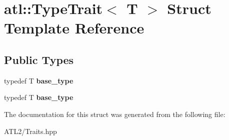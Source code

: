 \hypertarget{structatl_1_1_type_trait}{\section{atl\+:\+:Type\+Trait$<$ T $>$ Struct Template Reference}
\label{structatl_1_1_type_trait}
}
\subsection*{Public Types}
\begin{DoxyCompactItemize}
\item 
\hypertarget{structatl_1_1_type_trait_ad519a7357189ce6d854179aca8b3440c}{typedef T {\bfseries base\+\_\+type}}\label{structatl_1_1_type_trait_ad519a7357189ce6d854179aca8b3440c}

\item 
\hypertarget{structatl_1_1_type_trait_ad519a7357189ce6d854179aca8b3440c}{typedef T {\bfseries base\+\_\+type}}\label{structatl_1_1_type_trait_ad519a7357189ce6d854179aca8b3440c}

\end{DoxyCompactItemize}


The documentation for this struct was generated from the following file\+:\begin{DoxyCompactItemize}
\item 
A\+T\+L2/Traits.\+hpp\end{DoxyCompactItemize}
